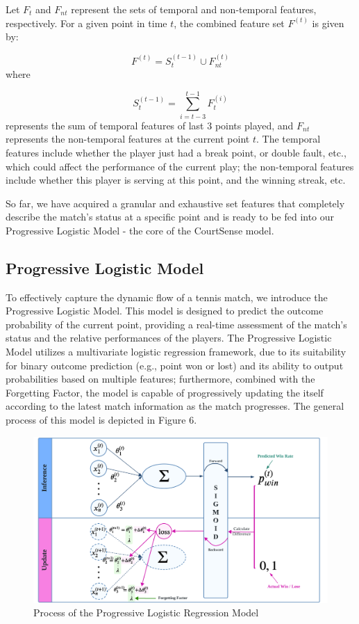 \documentclass[12pt]{article}  %
\begin{document}
Let \( F_{t} \) and \( F_{nt} \) represent the sets of temporal and non-temporal features, respectively. For a given point in time \( t \), the combined feature set \( F^{(t)} \) is given by:

\[
F^{(t)} = S_{t}^{(t-1)} \cup F_{nt}^{(t)}
\]
where

\[
S_{t}^{(t-1)} = \sum_{i=t-3}^{t-1} F_{t}^{(i)}
\]
represents the sum of temporal features of last 3 points played, and \( F_{nt} \) represents the non-temporal features at the current point \( t \). The temporal features include whether the player just had a break point, or double fault, etc., which could affect the performance of the current play; the non-temporal features include whether this player is serving at this point, and the winning streak, etc.

So far, we have acquired a granular and exhaustive set features that completely describe the match's status at a specific point and is ready to be fed into our Progressive Logistic Model - the core of the CourtSense model.

\subsection{Progressive Logistic Model}
To effectively capture the dynamic flow of a tennis match, we introduce the Progressive Logistic Model. This model is designed to predict the outcome probability of the current point, providing a real-time assessment of the match's status and the relative performances of the players. The Progressive Logistic Model utilizes a multivariate logistic regression framework, due to its suitability for binary outcome prediction (e.g., point won or lost) and its ability to output probabilities based on multiple features; furthermore, combined with the Forgetting Factor, the model is capable of progressively updating the itself according to the latest match information as the match progresses. The general process of this model is depicted in Figure 6. 

\begin{figure}[htbp]  %
	\centering  %
	\includegraphics[width=.9\textwidth]{logistic.png} %
	\caption{Process of the Progressive Logistic Regression Model} %
\end{figure}
\vspace{-0.8cm}
\end{document}
